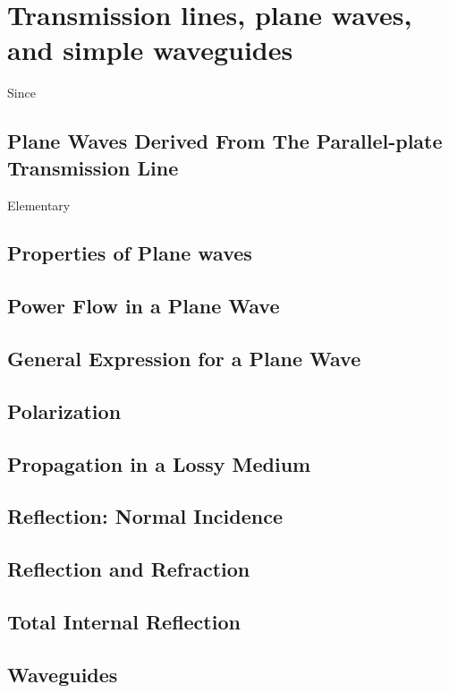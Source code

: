 \appendix

\chapter{Transmission lines, plane waves, and simple waveguides}
\label{ch:tranline}
Since

\section{Plane Waves Derived From The Parallel-plate Transmission Line}
Elementary 

\section{Properties of Plane waves}

\section{Power Flow in a Plane Wave}

\section{General Expression for a Plane Wave}

\section{Polarization}
\label{sec:polarization}

\section{Propagation in a Lossy Medium}
\label{sec:promed}

\section{Reflection: Normal Incidence}

\section{Reflection and Refraction}

\section{Total Internal Reflection}
\label{sec:totref}

\section{Waveguides}
\label{sec:wg}

